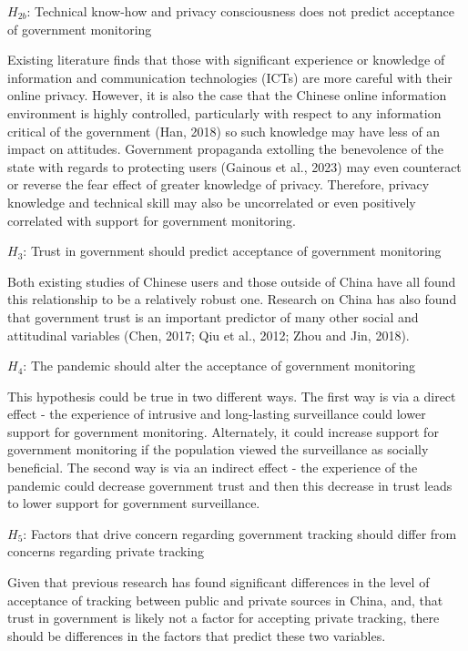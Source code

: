 \documentclass[
  letterpaper,
  DIV=11,
  numbers=noendperiod]{scrartcl}
\begin{document}
\(H_{2b}\): Technical know-how and privacy consciousness does not
predict acceptance of government monitoring

Existing literature finds that those with significant experience or
knowledge of information and communication technologies (ICTs) are more
careful with their online privacy. However, it is also the case that the
Chinese online information environment is highly controlled,
particularly with respect to any information critical of the government
(Han, 2018) so such knowledge may have less of an impact on attitudes.
Government propaganda extolling the benevolence of the state with
regards to protecting users (Gainous et al., 2023) may even counteract
or reverse the fear effect of greater knowledge of privacy. Therefore,
privacy knowledge and technical skill may also be uncorrelated or even
positively correlated with support for government monitoring.

\(H_3\): Trust in government should predict acceptance of government
monitoring

Both existing studies of Chinese users and those outside of China have
all found this relationship to be a relatively robust one. Research on
China has also found that government trust is an important predictor of
many other social and attitudinal variables (Chen, 2017; Qiu et al.,
2012; Zhou and Jin, 2018).

\(H_4\): The pandemic should alter the acceptance of government
monitoring

This hypothesis could be true in two different ways. The first way is
via a direct effect - the experience of intrusive and long-lasting
surveillance could lower support for government monitoring. Alternately,
it could increase support for government monitoring if the population
viewed the surveillance as socially beneficial. The second way is via an
indirect effect - the experience of the pandemic could decrease
government trust and then this decrease in trust leads to lower support
for government surveillance.

\(H_5\): Factors that drive concern regarding government tracking should
differ from concerns regarding private tracking

Given that previous research has found significant differences in the
level of acceptance of tracking between public and private sources in
China, and, that trust in government is likely not a factor for
accepting private tracking, there should be differences in the factors
that predict these two variables.
\end{document}
